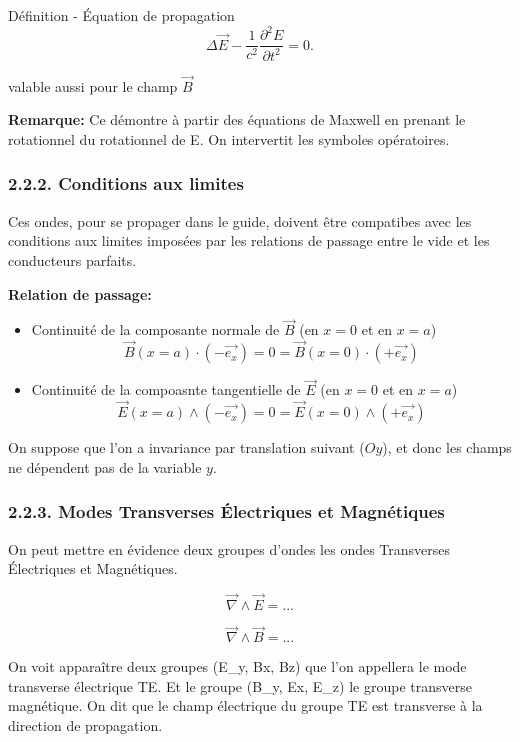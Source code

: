 \documentclass[french, a4paper, 10pt, twocolumn, landscape]{article}
\begin{document}
\begin{definition}{Définition - Équation de propagation}
	\begin{equation}
		\Delta\vec{E} - \frac{1}{c^2}\frac{\partial^2E}{\partial t^2} = 0.
	\end{equation}

	valable aussi pour le champ $\vec{B}$
\end{definition}

	\textbf{Remarque: } Ce démontre à partir des équations de Maxwell en prenant le rotationnel du rotationnel de E. On intervertit les symboles opératoires.


\subsubsection*{2.2.2. Conditions aux limites}


Ces ondes, pour se propager dans le guide, doivent être compatibes avec les conditions aux limites imposées par les relations de passage entre le vide et les conducteurs parfaits.

	\textbf{Relation de passage:}\medskip

	\begin{itemize}
		\item Continuité de la composante normale de $\vec{B}$ (en $x=0$ et en $x=a$)
		\[\vec{B}(x=a)\cdot(-\vec{e_x}) = 0 = \vec{B}(x=0)\cdot(+\vec{e_x})\]
		\item Continuité de la compoasnte tangentielle de $\vec{E}$ (en $x=0$ et en $x=a$)
		\[\vec{E}(x=a)\wedge(-\vec{e_x}) = 0 = \vec{E}(x=0)\wedge(+\vec{e_x})\]
	\end{itemize}

On suppose que l'on a invariance par translation suivant ($Oy$), et donc les champs ne dépendent pas de la variable $y$.

\subsubsection*{2.2.3. Modes Transverses Électriques et Magnétiques}

On peut mettre en évidence deux groupes d'ondes les ondes Transverses Électriques et Magnétiques.

\[\vec{\nabla}\wedge \vec{E} = ...\]

\[\vec{\nabla}\wedge \vec{B} = ...\]

On voit apparaître deux groupes (E_y, Bx, Bz) que l'on appellera le mode transverse électrique TE. Et le groupe (B_y, Ex, E_z) le groupe transverse magnétique. On dit que le champ électrique du groupe TE est transverse à la direction de propagation. 
\end{document}
